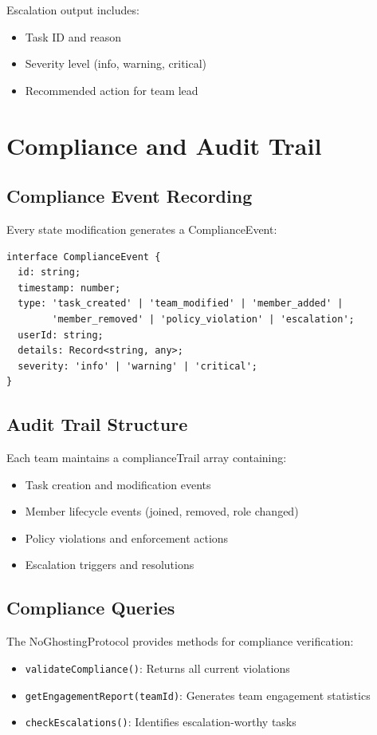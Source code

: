 \documentclass[12pt,a4paper]{article}
\begin{document}
Escalation output includes:
\begin{itemize}
  \item Task ID and reason
  \item Severity level (info, warning, critical)
  \item Recommended action for team lead
\end{itemize}

\section{Compliance and Audit Trail}

\subsection{Compliance Event Recording}

Every state modification generates a ComplianceEvent:

\begin{lstlisting}
interface ComplianceEvent {
  id: string;
  timestamp: number;
  type: 'task_created' | 'team_modified' | 'member_added' |
        'member_removed' | 'policy_violation' | 'escalation';
  userId: string;
  details: Record<string, any>;
  severity: 'info' | 'warning' | 'critical';
}
\end{lstlisting}

\subsection{Audit Trail Structure}

Each team maintains a complianceTrail array containing:
\begin{itemize}
  \item Task creation and modification events
  \item Member lifecycle events (joined, removed, role changed)
  \item Policy violations and enforcement actions
  \item Escalation triggers and resolutions
\end{itemize}

\subsection{Compliance Queries}

The NoGhostingProtocol provides methods for compliance verification:

\begin{itemize}
  \item \texttt{validateCompliance()}: Returns all current violations
  \item \texttt{getEngagementReport(teamId)}: Generates team engagement statistics
  \item \texttt{checkEscalations()}: Identifies escalation-worthy tasks
\end{itemize}
\end{document}
